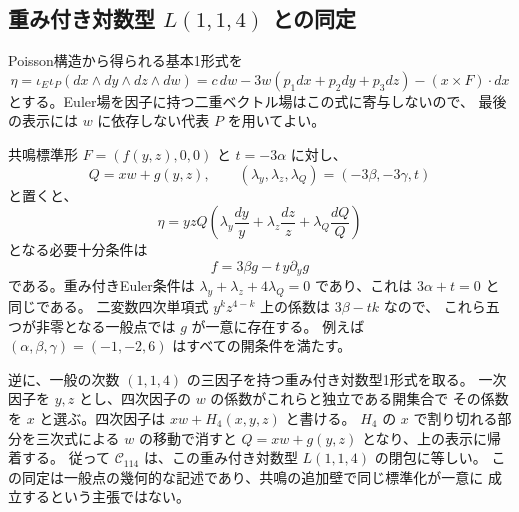 \subsection{重み付き対数型 $L(1,1,4)$ との同定}
\label{subsec:log114-v32}

Poisson構造から得られる基本1形式を
\[
 \eta=\iota_E\iota_P
       (dx\wedge dy\wedge dz\wedge dw)
      =c\,dw-3w(p_1dx+p_2dy+p_3dz)-(x\times F)\cdot dx
\]
とする。Euler場を因子に持つ二重ベクトル場はこの式に寄与しないので、
最後の表示には $w$ に依存しない代表 $P$ を用いてよい。

共鳴標準形 $F=(f(y,z),0,0)$ と $t=-3\alpha$ に対し、
\[
 Q=xw+g(y,z),\qquad
 (\lambda_y,\lambda_z,\lambda_Q)=(-3\beta,-3\gamma,t)
\]
と置くと、
\[
 \eta=yzQ\left(\lambda_y\frac{dy}{y}+
                   \lambda_z\frac{dz}{z}+
                   \lambda_Q\frac{dQ}{Q}\right)
\]
となる必要十分条件は
\[
 f=3\beta g-t\,y\partial_y g
\]
である。重み付きEuler条件は
$\lambda_y+\lambda_z+4\lambda_Q=0$ であり、これは $3\alpha+t=0$ と同じである。
二変数四次単項式 $y^kz^{4-k}$ 上の係数は $3\beta-tk$ なので、
これら五つが非零となる一般点では $g$ が一意に存在する。
例えば $(\alpha,\beta,\gamma)=(-1,-2,6)$ はすべての開条件を満たす。

逆に、一般の次数 $(1,1,4)$ の三因子を持つ重み付き対数型1形式を取る。
一次因子を $y,z$ とし、四次因子の $w$ の係数がこれらと独立である開集合で
その係数を $x$ と選ぶ。四次因子は $xw+H_4(x,y,z)$ と書ける。
$H_4$ の $x$ で割り切れる部分を三次式による $w$ の移動で消すと
$Q=xw+g(y,z)$ となり、上の表示に帰着する。
従って $\mathscr C_{114}$ は、この重み付き対数型 $L(1,1,4)$ の閉包に等しい。
この同定は一般点の幾何的な記述であり、共鳴の追加壁で同じ標準化が一意に
成立するという主張ではない。

